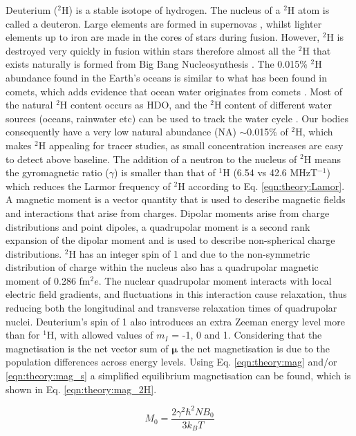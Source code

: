 Deuterium ($^2$H) is a stable isotope of hydrogen. The nucleus of a $^2$H atom is called a deuteron. Large elements are formed in supernovas \cite{Watson2019IdentificationStars}, whilst lighter elements up to iron are made in the cores of stars during fusion. However, $^2$H is destroyed very quickly in fusion within stars \cite{Patrignani2016ReviewPhysics} therefore almost all the $^2$H that exists naturally is formed from Big Bang Nucleosynthesis \cite{Joseph2023GeologicalEarth}. The 0.015\% $^2$H abundance found in the Earth's oceans is similar to what has been found in comets, which adds evidence that ocean water originates from comets \cite{Hersant2001APlanets}. Most of the natural $^2$H content occurs as \ac{HDO}, and the $^2$H content of different water sources (oceans, rainwater etc) can be used to track the water cycle \cite{Bowen2019IsotopesApplications}. Our bodies consequently have a very low natural abundance (NA) $\sim$0.015\% of $^2$H, which makes $^2$H appealing for tracer studies, as small concentration increases are easy to detect above baseline. The addition of a neutron to the nucleus of $^2$H means the gyromagnetic ratio ($\gamma$) is smaller than that of $^1$H (6.54 vs 42.6 MHzT$^{-1}$) which reduces the Larmor frequency of $^2$H according to Eq. \ref{eqn:theory:Lamor}. A magnetic moment is a vector quantity that is used to describe magnetic fields and interactions that arise from charges. Dipolar moments arise from charge distributions and point dipoles, a quadrupolar moment is a second rank expansion of the dipolar moment and is used to describe non-spherical charge distributions. $^2$H has an integer spin of 1 and due to the non-symmetric distribution of charge within the nucleus also has a quadrupolar magnetic moment of 0.286 fm$^2e$. The nuclear quadrupolar moment interacts with local electric field gradients, and fluctuations in this interaction cause relaxation, thus reducing both the longitudinal and transverse relaxation times of quadrupolar nuclei. Deuterium's spin of 1 also introduces an extra Zeeman energy level more than for $^1$H, with allowed values of $m_I$ = -1, 0 and 1. Considering that the magnetisation is the net vector sum of $\mathbf{\mu}$ the net magnetisation is due to the population differences 
across energy levels. Using Eq. \ref{eqn:theory:mag} and/or \ref{eqn:theory:mag_s} a simplified equilibrium magnetisation can be found, which is shown in Eq. \ref{eqn:theory:mag_2H}.

\begin{equation}
    M_0 = \frac{2\gamma^2 \hbar^2 N B_0}{3k_BT}
    \label{eqn:theory:mag_2H}
\end{equation}

